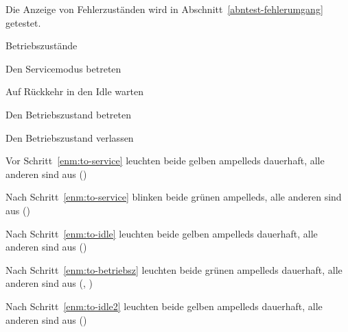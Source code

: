     \label{abntest-zustandsanzeigen}
    \begin{anmerkungen}
        \item Die Anzeige von Fehlerzuständen wird in Abschnitt~\ref{abntest-fehlerumgang} getestet.
    \end{anmerkungen}

    \begin{ablauf}{Betriebszustände}
        \item \label{enm:to-service} Den Servicemodus betreten
        \item \label{enm:to-idle} Auf Rückkehr in den Idle warten
        \item \label{enm:to-betriebsz} Den Betriebszustand betreten
        \item \label{enm:to-idle2} Den Betriebszustand verlassen
    \end{ablauf}
    \begin{erwartung}
        \item Vor Schritt~\ref{enm:to-service} leuchten
        beide gelben \glspl{ampelled} dauerhaft, alle anderen sind aus ()
        \item Nach Schritt~\ref{enm:to-service} blinken
        beide grünen \glspl{ampelled}, alle anderen sind aus ()
        \item Nach Schritt~\ref{enm:to-idle} leuchten
        beide gelben \glspl{ampelled} dauerhaft, alle anderen sind aus ()
        \item Nach Schritt~\ref{enm:to-betriebsz} leuchten
        beide grünen \glspl{ampelled} dauerhaft, alle anderen sind aus (, )
        \item Nach Schritt~\ref{enm:to-idle2} leuchten
        beide gelben \glspl{ampelled} dauerhaft, alle anderen sind aus ()
    \end{erwartung}
